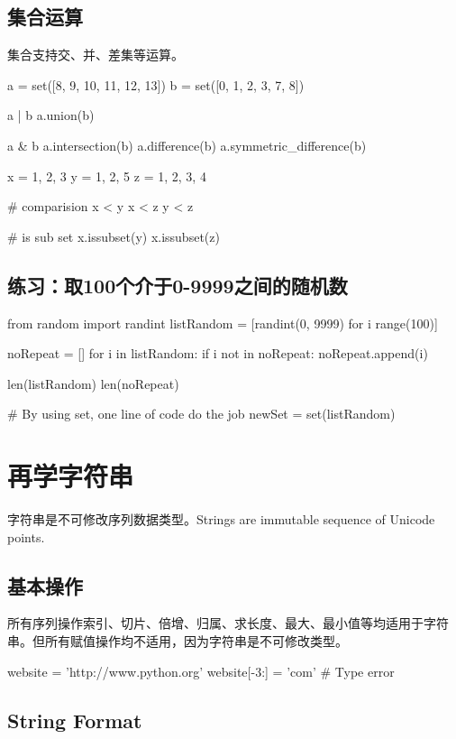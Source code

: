 \subsection{集合运算}
集合支持交、并、差集等运算。
\begin{python}
a = set([8, 9, 10, 11, 12, 13])
b = set([0, 1, 2, 3, 7, 8])

a | b   
a.union(b)

a & b    
a.intersection(b)  
a.difference(b) 
a.symmetric_difference(b) 

x = {1, 2, 3}
y = {1, 2, 5}
z = {1, 2, 3, 4}

#  comparision
x < y
x < z
y < z

#  is sub set
x.issubset(y)
x.issubset(z)
\end{python}
\subsection{练习：取100个介于0-9999之间的随机数}
\begin{python}
from random import randint
listRandom = [randint(0, 9999) for i range(100)]

noRepeat = []
for i in listRandom:
    if i not in noRepeat:
        noRepeat.append(i)

len(listRandom)
len(noRepeat)

# By using set, one line of code do the job
newSet = set(listRandom)
\end{python}
\section{再学字符串}
字符串是不可修改序列数据类型。Strings are immutable sequence of
Unicode points.
\subsection{基本操作}
所有序列操作索引、切片、倍增、归属、求长度、最大、最小值等均适用于字符串。但所有赋值操作均不适用，因为字符串是不可修改类型。
\begin{python}
website = 'http://www.python.org'
website[-3:] = 'com'  # Type error
\end{python}
\subsection{String Format}
